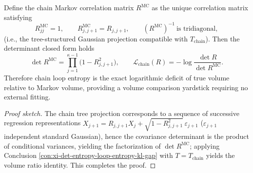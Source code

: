 \begin{conclusion}\label{con:xi-det-entropy-markov-volume-ratio}
Define the chain Markov correlation matrix \(R^{\mathrm{MC}}\) as the unique correlation matrix satisfying
\[
R^{\mathrm{MC}}_{jj}=1,\qquad
R^{\mathrm{MC}}_{j,j+1}=R_{j,j+1},
\qquad
(R^{\mathrm{MC}})^{-1}\ \text{is tridiagonal},
\]
(i.e., the tree-structured Gaussian projection compatible with \(T_{\mathrm{chain}}\)).
Then the determinant closed form holds
\[
\det R^{\mathrm{MC}}=\prod_{j=1}^{\kappa-1}\bigl(1-R_{j,j+1}^2\bigr),
\qquad
\mathcal L_{\mathrm{chain}}(R)= -\log\frac{\det R}{\det R^{\mathrm{MC}}}.
\]
Therefore chain loop entropy is the exact logarithmic deficit of true volume relative to Markov volume, providing a volume comparison yardstick requiring no external fitting.
\end{conclusion}
\begin{proof}[Proof sketch]
The chain tree projection corresponds to a sequence of successive regression representations
\(
X_{j+1}=R_{j,j+1}X_j+\sqrt{1-R_{j,j+1}^2}\,\varepsilon_{j+1}
\)
(\(\varepsilon_{j+1}\) independent standard Gaussian), hence the covariance determinant is the product of conditional variances, yielding the factorization of \(\det R^{\mathrm{MC}}\);
applying Conclusion \ref{con:xi-det-entropy-loop-entropy-kl-gap} with \(T=T_{\mathrm{chain}}\) yields the volume ratio identity. This completes the proof.
\end{proof}

